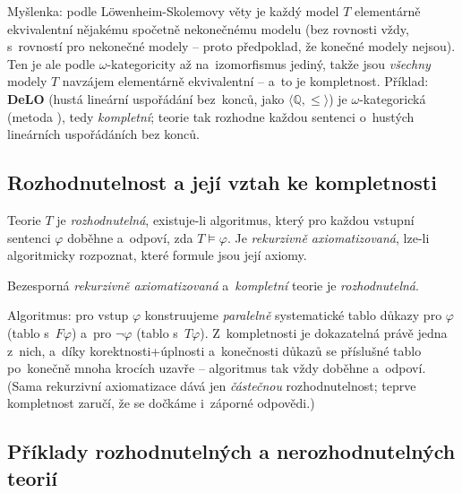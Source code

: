 \documentclass[11pt,a4paper]{article}
\begin{document}
\begin{intuice}
Myšlenka: podle Löwenheim-Skolemovy věty je každý model $T$ elementárně ekvivalentní nějakému spočetně nekonečnému modelu (bez rovnosti vždy, s~rovností pro nekonečné modely -- proto předpoklad, že konečné modely nejsou). Ten je ale podle $\omega$-kategoricity až na~izomorfismus jediný, takže jsou \emph{všechny} modely $T$ navzájem elementárně ekvivalentní -- a~to je kompletnost. Příklad: \textbf{DeLO} (hustá lineární uspořádání bez~konců, jako $\langle\mathbb{Q},\le\rangle$) je $\omega$-kategorická (metoda ), tedy \emph{kompletní}; teorie tak rozhodne každou sentenci o~hustých lineárních uspořádáních bez konců.
\end{intuice}

\subsection{Rozhodnutelnost a její vztah ke kompletnosti}

\begin{definice}
Teorie $T$ je \emph{rozhodnutelná}, existuje-li algoritmus, který pro každou vstupní sentenci $\varphi$ doběhne a~odpoví, zda $T\models\varphi$. Je \emph{rekurzivně axiomatizovaná}, lze-li algoritmicky rozpoznat, které formule jsou její axiomy.
\end{definice}

\begin{veta}
Bezesporná \emph{rekurzivně axiomatizovaná} a~\emph{kompletní} teorie je \emph{rozhodnutelná}.
\end{veta}

\begin{intuice}
Algoritmus: pro vstup $\varphi$ konstruujeme \emph{paralelně} systematické tablo důkazy pro $\varphi$ (tablo s~$F\varphi$) a~pro $\neg\varphi$ (tablo s~$T\varphi$). Z~kompletnosti je dokazatelná právě jedna z~nich, a~díky korektnosti+úplnosti a~konečnosti důkazů se příslušné tablo po~konečně mnoha krocích uzavře -- algoritmus tak vždy doběhne a~odpoví. (Sama rekurzivní axiomatizace dává jen \emph{částečnou} rozhodnutelnost; teprve kompletnost zaručí, že se dočkáme i~záporné odpovědi.)
\end{intuice}

\subsection{Příklady rozhodnutelných a nerozhodnutelných teorií}
\end{document}
